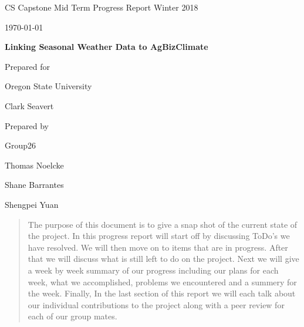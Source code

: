 \documentclass[onecolumn, draftclsnofoot,10pt, compsoc]{article}
\def \CapstoneTeamName{AgBizClimate}
\def \CapstoneTeamNumber{26}
\def \GroupMemberOne{	Thomas Noelcke}
\def \GroupMemberTwo{	Shane Barrantes}
\def \GroupMemberThree{	Shengpei Yuan}
\def \CapstoneProjectName{ Linking Seasonal Weather Data to AgBizClimate\texttrademark}
\def \CapstoneSponsorCompany{ Oregon State University}
\def \CapstoneSponsorPerson{ Clark Seavert}
\def \DocType{		%
				Mid Term Progress Report Winter 2018
				}
\newcommand{\NameSigPair}[1]{\par
\makebox[2.75in][r]{#1} \hfil 	\makebox[3.25in]{\makebox[2.25in]{\hrulefill} \hfill		\makebox[.75in]{\hrulefill}}
\par\vspace{-12pt} \textit{\tiny\noindent
\makebox[2.75in]{} \hfil		\makebox[3.25in]{\makebox[2.25in][r]{Signature} \hfill	\makebox[.75in][r]{Date}}}}
\renewcommand{\NameSigPair}[1]{#1}
\begin{document}
\begin{titlepage}
    \begin{singlespace}
        \hfill
        \par\vspace{.2in}
        \centering
        \scshape{
            \huge CS Capstone \DocType \par
            {\large\today}\par
            \vspace{.5in}
            \textbf{\Huge\CapstoneProjectName}\par
            \vfill
            {\large Prepared for}\par
            \Huge \CapstoneSponsorCompany\par
            \vspace{5pt}
            {\Large\NameSigPair{\CapstoneSponsorPerson}\par}
            {\large Prepared by }\par
            Group\CapstoneTeamNumber\par
            \vspace{5pt}
            {\Large
                \NameSigPair{\GroupMemberOne}\par
                \NameSigPair{\GroupMemberTwo}\par
                \NameSigPair{\GroupMemberThree}\par
            }
            \vspace{20pt}
        }
        \begin{abstract}
					 The purpose of this document is to give a snap shot of the current state of the project. In this progress report will start off by discussing ToDo's we have resolved. We will then move on to items that are in progress. After that we will discuss what is still left to do on the project. Next we will give a week by week summary of our progress including our plans for each week, what we accomplished, problems we encountered and a summery for the week. Finally, In the last section of this report we will each talk about our individual contributions to the project along with a peer review for each of our group mates.\\
        \end{abstract}
    \end{singlespace}
\end{titlepage}
\newpage
{}
\tableofcontents
\newpage
\clearpage
\end{document}
